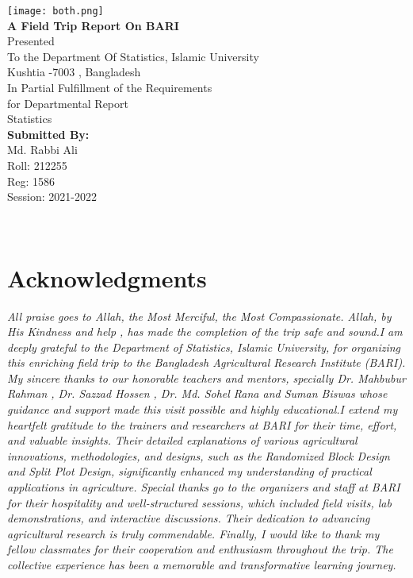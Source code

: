 \documentclass[oneside,12pt,fleqn]{book}
\begin{document}
\makeatletter
\begin{titlepage}
    \centering
    \vspace*{1cm}
       { \texttt{[image: both.png]}}\\[1cm]

    {\LARGE \textbf{A Field Trip Report On BARI}}\\[1cm]
    Presented\\[1cm]
    
    To the Department Of Statistics, Islamic University\\
   Kushtia -7003 , Bangladesh\\[0.5cm]
    
    In Partial Fulfillment of the Requirements\\
    for Departmental Report  \\[0.3cm]
    
    Statistics\\[1.0cm]
    \textbf{Submitted By:}{ }\\[0.5cm]
    Md. Rabbi Ali\\
    Roll: 212255\\
    Reg: 1586\\
    Session: 2021-2022\\
    \date{\large Date Last Edited: \today}
    {\@date\\}
\end{titlepage}

\tableofcontents
\newpage

\chapter*{Acknowledgments}
\textit{All praise goes to Allah, the Most Merciful, the Most Compassionate. Allah, by His Kindness and help , has made the completion of the trip safe and sound.I am deeply grateful to the Department of Statistics, Islamic University, for organizing this enriching field trip to the Bangladesh Agricultural Research Institute (BARI). My sincere thanks to our honorable teachers and mentors, specially  Dr. Mahbubur Rahman , Dr. Sazzad Hossen , Dr. Md. Sohel Rana and Suman Biswas whose guidance and support made this visit possible and highly educational.I extend my heartfelt gratitude to the trainers and researchers at BARI for their time, effort, and valuable insights. Their detailed explanations of various agricultural innovations, methodologies, and designs, such as the Randomized Block Design and Split Plot Design, significantly enhanced my understanding of practical applications in agriculture. Special thanks go to the organizers and staff at BARI for their hospitality and well-structured sessions, which included field visits, lab demonstrations, and interactive discussions. Their dedication to advancing agricultural research is truly commendable.
Finally, I would like to thank my fellow classmates for their cooperation and enthusiasm throughout the trip. The collective experience has been a memorable and transformative learning journey.}
\end{document}
